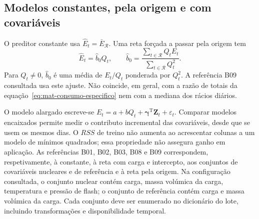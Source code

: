 \subsection{Modelos constantes, pela origem e com covariáveis}
\label{sec:mat-modelos-comparadores}
O preditor constante usa $\widehat E_t=\bar
E_{\mathcal R}$. Uma reta forçada a passar pela origem tem
\begin{equation}
\widehat E_t=\widehat b_0Q_t,
\qquad \widehat b_0=\frac{\sum_{t\in\mathcal R}Q_tE_t}{\sum_{t\in\mathcal R}Q_t^2}.
\label{eq:mat-origem}
\end{equation}
Para $Q_t\neq0$, $\widehat b_0$ é uma média de $E_t/Q_t$ ponderada por $Q_t^2$. A referência B09 consultada usa este ajuste. Não coincide, em geral, com a razão de totais da equação~\ref{eq:mat-consumo-especifico} nem com a mediana dos rácios diários.

O modelo alargado escreve-se $E_t=a+bQ_t+\boldsymbol\gamma^{\mathrm T}\boldsymbol Z_t+\varepsilon_t$. Comparar modelos encaixados permite medir o contributo incremental das covariáveis, desde que se usem os mesmos dias. O $RSS$ de treino não aumenta ao acrescentar colunas a um modelo de mínimos quadrados; essa propriedade não assegura ganho em aplicação. As referências B01, B02, B03, B08 e B09 correspondem, respetivamente, à constante, à reta com carga e intercepto, aos conjuntos de covariáveis nucleares e de referência e à reta pela origem. Na configuração consultada, o conjunto nuclear contém carga, massa volúmica da carga, temperatura e pressão de flash; o conjunto de referência contém carga e massa volúmica da carga. Cada conjunto deve ser enumerado no dicionário do lote, incluindo transformações e disponibilidade temporal.


